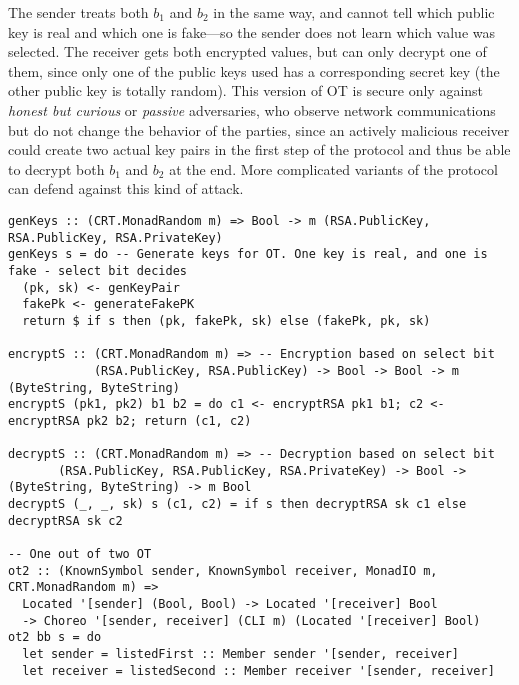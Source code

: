 \documentclass[sigplan,screen,review,anonymous]{acmart}
\begin{document}
The sender treats both $b_1$ and $b_2$ in the same way, and cannot tell which public key is real and which one is fake---so the sender does not learn which value was selected. The receiver gets both encrypted values, but can only decrypt one of them, since only one of the public keys used has a corresponding secret key (the other public key is totally random). This version of OT is secure only against \emph{honest but curious} or \emph{passive} adversaries, who observe network communications but do not change the behavior of the parties, since an actively malicious receiver could create two actual key pairs in the first step of the protocol and thus be able to decrypt both $b_1$ and $b_2$ at the end. More complicated variants of the protocol can defend against this kind of attack.

\begin{figure*}
\begin{mdframed}
\begin{verbatim}
genKeys :: (CRT.MonadRandom m) => Bool -> m (RSA.PublicKey, RSA.PublicKey, RSA.PrivateKey)
genKeys s = do -- Generate keys for OT. One key is real, and one is fake - select bit decides
  (pk, sk) <- genKeyPair
  fakePk <- generateFakePK
  return $ if s then (pk, fakePk, sk) else (fakePk, pk, sk)

encryptS :: (CRT.MonadRandom m) => -- Encryption based on select bit
            (RSA.PublicKey, RSA.PublicKey) -> Bool -> Bool -> m (ByteString, ByteString)
encryptS (pk1, pk2) b1 b2 = do c1 <- encryptRSA pk1 b1; c2 <- encryptRSA pk2 b2; return (c1, c2)

decryptS :: (CRT.MonadRandom m) => -- Decryption based on select bit
       (RSA.PublicKey, RSA.PublicKey, RSA.PrivateKey) -> Bool -> (ByteString, ByteString) -> m Bool
decryptS (_, _, sk) s (c1, c2) = if s then decryptRSA sk c1 else decryptRSA sk c2

-- One out of two OT
ot2 :: (KnownSymbol sender, KnownSymbol receiver, MonadIO m, CRT.MonadRandom m) =>
  Located '[sender] (Bool, Bool) -> Located '[receiver] Bool
  -> Choreo '[sender, receiver] (CLI m) (Located '[receiver] Bool)
ot2 bb s = do
  let sender = listedFirst :: Member sender '[sender, receiver]
  let receiver = listedSecond :: Member receiver '[sender, receiver]


\end{verbatim}
\end{mdframed}
\end{figure*}
\end{document}
